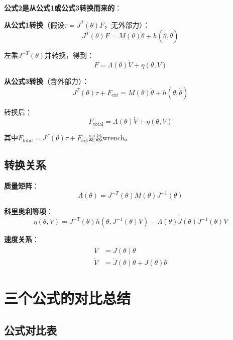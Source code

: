 \documentclass[12pt,a4paper]{article}
\begin{document}
\textbf{公式2是从公式1或公式3转换而来的}：

\textbf{从公式1转换}（假设$\tau = J^T(\theta)F$，无外部力）：
\begin{equation}
J^T(\theta)F = M(\theta)\ddot{\theta} + h(\theta, \dot{\theta})
\end{equation}

左乘$J^{-T}(\theta)$并转换，得到：
\begin{equation}
F = \Lambda(\theta)\dot{V} + \eta(\theta, V)
\end{equation}

\textbf{从公式3转换}（含外部力）：
\begin{equation}
J^T(\theta)\tau + F_{\text{ext}} = M(\theta)\ddot{\theta} + h(\theta, \dot{\theta})
\end{equation}

转换后：
\begin{equation}
F_{\text{total}} = \Lambda(\theta)\dot{V} + \eta(\theta, V)
\end{equation}

其中$F_{\text{total}} = J^T(\theta)\tau + F_{\text{ext}}$是总wrench。

\subsection{转换关系}

\textbf{质量矩阵}：
\begin{equation}
\Lambda(\theta) = J^{-T}(\theta)M(\theta)J^{-1}(\theta) \tag{8.90}
\end{equation}

\textbf{科里奥利等项}：
\begin{equation}
\eta(\theta, V) = J^{-T}(\theta)h(\theta, J^{-1}(\theta)V) - \Lambda(\theta)\dot{J}(\theta)J^{-1}(\theta)V \tag{8.91}
\end{equation}

\textbf{速度关系}：
\begin{align}
V &= J(\theta)\dot{\theta} \tag{8.83} \\
\dot{V} &= \dot{J}(\theta)\dot{\theta} + J(\theta)\ddot{\theta} \tag{8.84}
\end{align}

\section{三个公式的对比总结}

\subsection{公式对比表}
\end{document}
